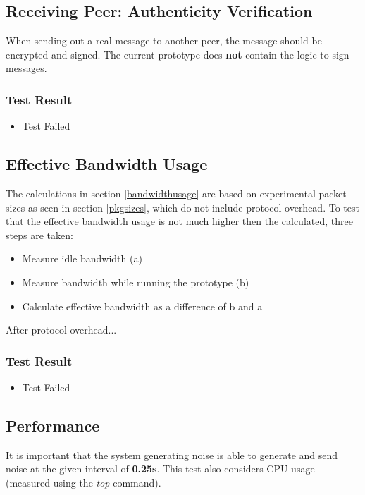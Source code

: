 \subsection{Receiving Peer: Authenticity Verification}
When sending out a real message to another peer, the message should be
encrypted and signed. The current prototype does \textbf{not} contain
the logic to sign messages.
\subsubsection{Test Result}
\begin{itemize}
\item Test Failed
\end{itemize}
\subsection{Effective Bandwidth Usage}
The calculations in section \ref{bandwidthusage} are based on experimental
packet sizes as seen in section \ref{pkgsizes}, which do not include
protocol overhead. To test that the effective bandwidth usage is
not much higher then the calculated, three steps are taken:
\begin{itemize}
\item Measure idle bandwidth (a)
\item Measure bandwidth while running the prototype (b)
\item Calculate effective bandwidth as a difference of b and a
\end{itemize}

After protocol overhead...
\subsubsection{Test Result}
\begin{itemize}
\item Test Failed
\end{itemize}
\subsection{Performance}
It is important that the system generating noise is able to generate 
and send noise at the given interval of \textbf{0.25s}.
This test also considers CPU usage (measured using the \textit{top} command).


